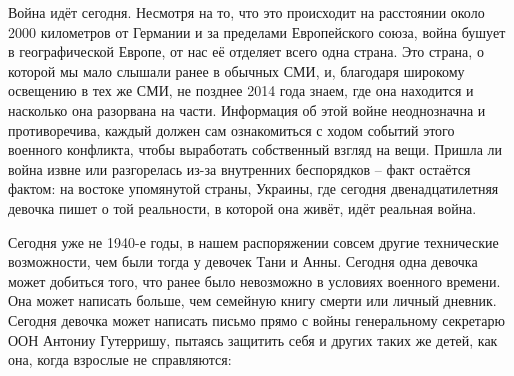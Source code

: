 Война идёт сегодня. Несмотря на то, что это происходит на расстоянии около 2000
километров от Германии и за пределами Европейского союза, война бушует в
географической Европе, от нас её отделяет всего одна страна. Это страна, о
которой мы мало слышали ранее в обычных СМИ, и, благодаря широкому освещению в
тех же СМИ, не позднее 2014 года знаем, где она находится и насколько она
разорвана на части. Информация об этой войне неоднозначна и противоречива,
каждый должен сам ознакомиться с ходом событий этого военного конфликта, чтобы
выработать собственный взгляд на вещи. Пришла ли война извне или разгорелась
из-за внутренних беспорядков – факт остаётся фактом: на востоке упомянутой
страны, Украины, где сегодня двенадцатилетняя девочка пишет о той реальности, в
которой она живёт, идёт реальная война.


Сегодня уже не 1940-е годы, в нашем распоряжении совсем другие технические
возможности, чем были тогда у девочек Тани и Анны. Сегодня одна девочка может
добиться того, что ранее было невозможно в условиях военного времени. Она может
написать больше, чем семейную книгу смерти или личный дневник. Сегодня девочка
может написать письмо прямо с войны генеральному секретарю ООН Антониу
Гутерришу, пытаясь защитить себя и других таких же детей, как она, когда
взрослые не справляются:

